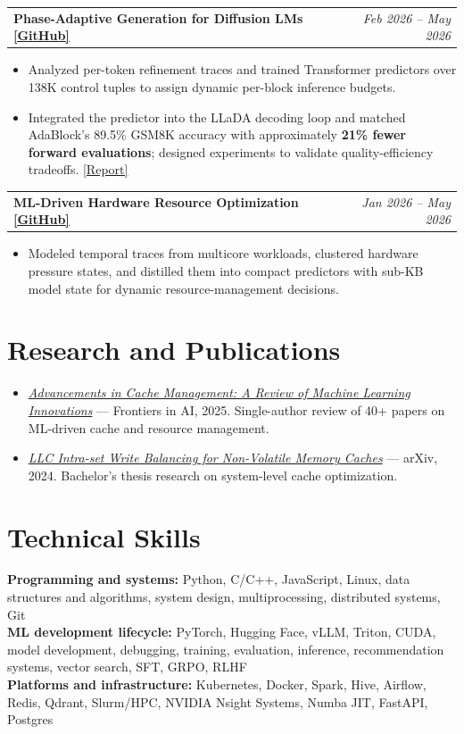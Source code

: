 \documentclass[10pt,letterpaper]{article}
\makeatletter
\newcommand{\project}[2]{%
  \begin{tabularx}{\textwidth}{@{}Xr@{}}
    \textbf{#1} & \textit{#2}
  \end{tabularx}\vspace{-0.25em}
}
\makeatother
\begin{document}
\vspace{0.55em}
\project{Phase-Adaptive Generation for Diffusion LMs \href{https://github.com/k-keshav-k/Phase-Assisted-Generation}{[GitHub]}}{Feb 2026 -- May 2026}
\begin{itemize}
  \item Analyzed per-token refinement traces and trained Transformer predictors over 138K control tuples to assign dynamic per-block inference budgets.
  \item Integrated the predictor into the LLaDA decoding loop and matched AdaBlock's 89.5\% GSM8K accuracy with approximately \textbf{21\% fewer forward evaluations}; designed experiments to validate quality-efficiency tradeoffs. \href{https://github.com/k-keshav-k/Phase-Assisted-Generation/blob/main/writeup/final_report.pdf}{[Report]}
\end{itemize}

\vspace{0.55em}
\project{ML-Driven Hardware Resource Optimization \href{https://github.com/k-keshav-k/ML-based-hardware-optimization-using-Phases}{[GitHub]}}{Jan 2026 -- May 2026}
\begin{itemize}
  \item Modeled temporal traces from multicore workloads, clustered hardware pressure states, and distilled them into compact predictors with sub-KB model state for dynamic resource-management decisions.
\end{itemize}

\section{Research and Publications}

\begin{itemize}
  \item \href{https://www.frontiersin.org/journals/artificial-intelligence/articles/10.3389/frai.2025.1441250/full}{\textit{Advancements in Cache Management: A Review of Machine Learning Innovations}} --- Frontiers in AI, 2025. Single-author review of 40+ papers on ML-driven cache and resource management.
  \item \href{https://arxiv.org/abs/2410.15344}{\textit{LLC Intra-set Write Balancing for Non-Volatile Memory Caches}} --- arXiv, 2024. Bachelor's thesis research on system-level cache optimization.
\end{itemize}

\section{Technical Skills}

\textbf{Programming and systems:} Python, C/C++, JavaScript, Linux, data structures and algorithms, system design, \mbox{multiprocessing}, distributed systems, Git\\
\textbf{ML development lifecycle:} PyTorch, Hugging Face, vLLM, Triton, CUDA, model development, debugging, training, evaluation, inference, recommendation systems, vector search, SFT, GRPO, RLHF\\
\textbf{Platforms and infrastructure:} Kubernetes, Docker, Spark, Hive, Airflow, Redis, Qdrant, Slurm/HPC, NVIDIA Nsight Systems, Numba JIT, FastAPI, Postgres
\end{document}
